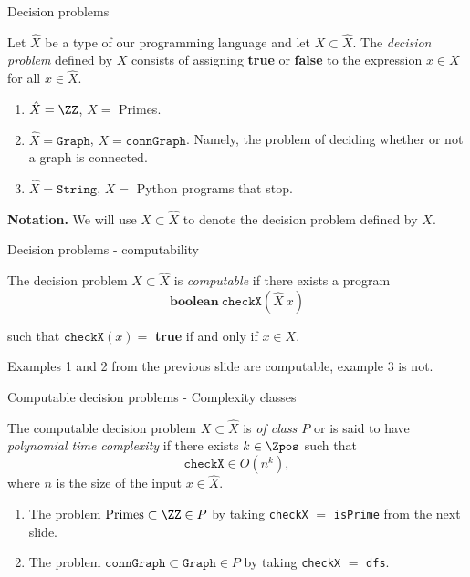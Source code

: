 \begin{frame}{Decision problems}
	\begin{defn}
		Let $\hat{X}$ be a type of our programming language and let
		$X \subset \hat{X}$. The \emph{decision problem} defined by $X$ consists
		of assigning \textbf{true} or \textbf{false} to the expression $x \in X$
		for all $x \in \hat{X}$. 
	\end{defn}

	\pause
	\begin{exl}
		\begin{enumerate}
			\item $\hat{X}= \ZZ$, $X=$ Primes.
			\item $\hat{X}= \mathtt{Graph}$, $X= \mathtt{connGraph}$. Namely,
				the problem of deciding whether or not a graph is
				connected.
			\item $\hat{X}= \mathtt{String}$, $X=$ Python programs that stop.
		\end{enumerate}
	\end{exl}

	\pause
	\textbf{Notation.} We will use $X \subset \hat{X}$ to denote the decision problem
	defined by $X$.
\end{frame}

%

\begin{frame}{Decision problems - computability}
	\begin{defn}
		The decision problem $X \subset \hat{X}$ is \emph{computable} if there
		exists a program
		\[
			\mathbf{boolean}\ \mathtt{checkX}(\hat{X}\ x)
		\]

		such that \(\mathtt{checkX}(x) =\) \textbf{true} if and only if
		$x \in X$.
	\end{defn}

	\pause
	\begin{exl}
		Examples 1 and 2 from the previous slide are computable, example 3 is
		not.
	\end{exl}
\end{frame}

%

\begin{frame}{Computable decision problems - Complexity classes}
	\begin{defn}
		The computable decision problem $X \subset \hat{X}$ is
		\emph{of class $P$} or is said to have \emph{polynomial time complexity}
		if there exists $k \in \Zpos$ such that
		\[
			\mathtt{checkX} \in O(n^k),
		\]
		where $n$ is the size of the input $x \in \hat{X}$.
	\end{defn}

	\pause
	\begin{exl}
		\begin{enumerate}
			\item The problem
				\(
					\text{Primes} \subset \ZZ \in P
				\)
				by taking \texttt{checkX} $=$ \texttt{isPrime} from the
				next slide.
			\item The problem 
				\(
					\mathtt{connGraph} \subset \mathtt{Graph} \in P
				\)
				by taking \texttt{checkX} $=$ \texttt{dfs}.
		\end{enumerate}
	\end{exl}
\end{frame}


